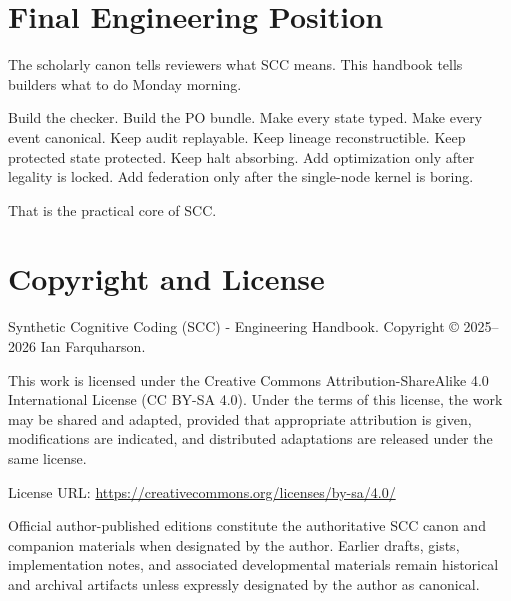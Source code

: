 \documentclass[11pt,oneside]{article}
\begin{document}
\section{Final Engineering Position}
The scholarly canon tells reviewers what SCC means. This handbook tells builders what to do Monday morning.

Build the checker. Build the PO bundle. Make every state typed. Make every event canonical. Keep audit replayable. Keep lineage reconstructible. Keep protected state protected. Keep halt absorbing. Add optimization only after legality is locked. Add federation only after the single-node kernel is boring.

That is the practical core of SCC.

\section{Copyright and License}
Synthetic Cognitive Coding (SCC) - Engineering Handbook. Copyright \copyright{} 2025--2026 Ian Farquharson.

This work is licensed under the Creative Commons Attribution-ShareAlike 4.0 International License (CC BY-SA 4.0). Under the terms of this license, the work may be shared and adapted, provided that appropriate attribution is given, modifications are indicated, and distributed adaptations are released under the same license.

License URL: \url{https://creativecommons.org/licenses/by-sa/4.0/}

Official author-published editions constitute the authoritative SCC canon and companion materials when designated by the author. Earlier drafts, gists, implementation notes, and associated developmental materials remain historical and archival artifacts unless expressly designated by the author as canonical.
\end{document}
